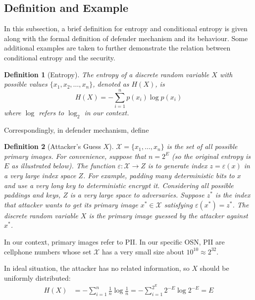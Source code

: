 \documentclass[10pt, conference, compsocconf]{IEEEtran}
\newtheorem{mydef}{Definition}
\begin{document}
    \subsection{Definition and Example}
        In this subsection, a brief definition for entropy and conditional
        entropy is given along with the formal definition of defender mechanism
        and its behaviour.
        Some additional examples are taken to further
        demonstrate the relation between conditional entropy and
        the security.

        \begin{mydef}[Entropy\cite{entropy}]\label{def_entropy}
            The entropy of a discrete random variable $X$ with
            possible values $\{x_1, x_2, \ldots, x_n\}$, denoted as  $H(X)$, is
            \begin{equation}
                H(X) = -\sum_{i=1}^n p(x_i)\log p(x_i)
            \end{equation}
            where $\log$ refers to $\log_2$ in our context.
        \end{mydef}

        Correspondingly, in defender mechanism, define
        \begin{mydef}[Attacker's Guess $X$]\label{def2}
            $\mathcal{X} = \{x_1, \ldots, x_n\}$ is the set of all possible
            primary images.
            For convenience, suppose that $n = 2^E$ (so the original entropy is $E$ as illustrated below).
            The function $\varepsilon: \mathcal X \rightarrow Z$ is to generate index $z = \varepsilon(x)$
            in a very large index space $Z$. For example, padding many deterministic bits to $x$ and use
            a very long key to deterministic encrypt it. Considering all possible paddings
            and keys, $Z$ is a very large space to adversaries.
            Suppose $z^*$ is the index that attacker wants to
            get its primary image $x^* \in \mathcal{X}$ satisfying $\varepsilon(x^*) = z^*$.
            The discrete random variable $X$ is the
            primary image guessed by the attacker against $x^*$.
        \end{mydef}
 
 		In our context, primary images refer to PII.
 		In our specific OSN, PII are cellphone numbers
		whose set $\mathcal X$ has a very small
        size about $10^{10} \approx 2^{32}$.

        In ideal situation, the attacker has no related information, so $X$ should
        be uniformly distributed:
        \begin{align*}
            H(X) &= -\sum_{i=1}^{n} \frac{1}{n} \log \frac{1}{n}
            	= -\sum_{i=1}^{2^E} 2^{-E} \log 2^{-E}
                = E
        \end{align*}
\end{document}
